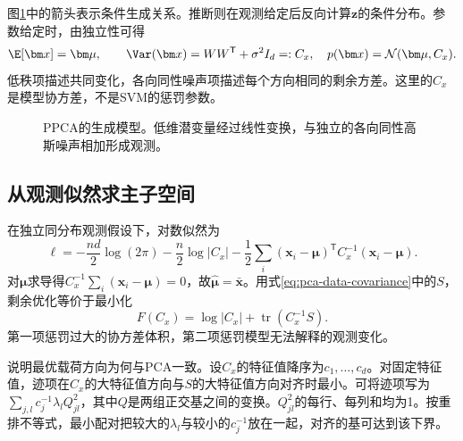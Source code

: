 图\ref{fig:ppca-generation}中的箭头表示条件生成关系。推断则在观测给定后反向计算$\bm z$的条件分布。参数给定时，由独立性可得
\begin{equation}
 \E[\bm x]=\bm\mu,\qquad
 \Var(\bm x)=WW^{\mathsf T}+\sigma^2I_d=:C_x,
 \quad p(\bm x)=\mathcal N(\bm\mu,C_x).
 \label{eq:ppca-marginal}
\end{equation}
低秩项描述共同变化，各向同性噪声项描述每个方向相同的剩余方差。这里的$C_x$是模型协方差，不是SVM的惩罚参数。

\begin{figure}[htbp]
\centering
{}
\caption{PPCA的生成模型。低维潜变量经过线性变换，与独立的各向同性高斯噪声相加形成观测。}
\label{fig:ppca-generation}
\end{figure}

\subsection{从观测似然求主子空间}
在独立同分布观测假设下，对数似然为
\begin{equation}
 \ell=-\frac{nd}{2}\log(2\pi)-\frac n2\log|C_x|
 -\frac12\sum_i(\bm x_i-\bm\mu)^{\mathsf T}C_x^{-1}(\bm x_i-\bm\mu).
\end{equation}
对$\bm\mu$求导得$C_x^{-1}\sum_i(\bm x_i-\bm\mu)=0$，故$\hat{\bm\mu}=\bar{\bm x}$。用式\eqref{eq:pca-data-covariance}中的$S$，剩余优化等价于最小化
\begin{equation}
 F(C_x)=\log|C_x|+\operatorname{tr}(C_x^{-1}S).
 \label{eq:ppca-likelihood-objective}
\end{equation}
第一项惩罚过大的协方差体积，第二项惩罚模型无法解释的观测变化。

说明最优载荷方向为何与PCA一致。设$C_x$的特征值降序为$c_1,\ldots,c_d$。对固定特征值，迹项在$C_x$的大特征值方向与$S$的大特征值方向对齐时最小。可将迹项写为$\sum_{j,l}c_j^{-1}\lambda_l Q_{jl}^2$，其中$Q$是两组正交基之间的变换。$Q_{jl}^2$的每行、每列和均为1。按重排不等式，最小配对把较大的$\lambda_l$与较小的$c_j^{-1}$放在一起，对齐的基可达到该下界。

